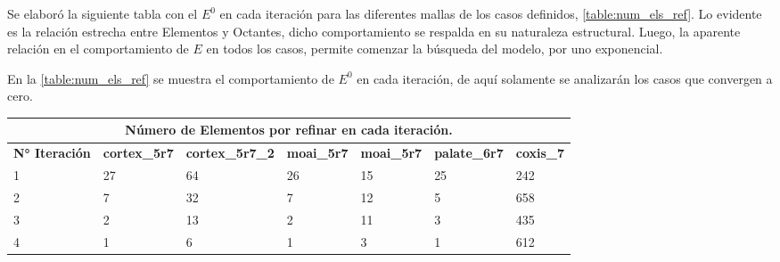Se elaboró la siguiente tabla con el $E^0$ en cada iteración para las diferentes mallas de los casos definidos, \autoref{table:num_els_ref}. Lo evidente es la relación estrecha entre Elementos y Octantes, dicho comportamiento se respalda en su naturaleza estructural. Luego, la aparente relación en el comportamiento de $E$ en todos los casos, permite comenzar la búsqueda del modelo, por uno exponencial.


En la \autoref{table:num_els_ref} se muestra el comportamiento de $E^0$ en cada iteración, de aquí solamente se analizarán los casos que convergen a cero.

\begin{table}[!ht]
\begin{tabular}{|lllllll|}
\hline
\multicolumn{7}{|c|}{Número de Elementos por refinar en cada iteración.}                                                                                                                                                                                                                    \\ \hline
\multicolumn{1}{|l|}{\textbf{N° Iteración}} & \multicolumn{1}{l|}{\textbf{cortex\_5r7}} & \multicolumn{1}{l|}{\textbf{cortex\_5r7\_2}} & \multicolumn{1}{l|}{\textbf{moai\_5r7}} & \multicolumn{1}{l|}{\textbf{moai\_5r7}} & \multicolumn{1}{l|}{\textbf{palate\_6r7}} & \textbf{coxis\_7} \\ \hline
\multicolumn{1}{|l|}{1}                     & \multicolumn{1}{l|}{27}                   & \multicolumn{1}{l|}{64}                      & \multicolumn{1}{l|}{26}                 & \multicolumn{1}{l|}{15}                 & \multicolumn{1}{l|}{25}                   & 242               \\ \hline
\multicolumn{1}{|l|}{2}                     & \multicolumn{1}{l|}{7}                    & \multicolumn{1}{l|}{32}                      & \multicolumn{1}{l|}{7}                  & \multicolumn{1}{l|}{12}                 & \multicolumn{1}{l|}{5}                    & 658               \\ \hline
\multicolumn{1}{|l|}{3}                     & \multicolumn{1}{l|}{2}                    & \multicolumn{1}{l|}{13}                      & \multicolumn{1}{l|}{2}                  & \multicolumn{1}{l|}{11}                 & \multicolumn{1}{l|}{3}                    & 435               \\ \hline
\multicolumn{1}{|l|}{4}                     & \multicolumn{1}{l|}{1}                    & \multicolumn{1}{l|}{6}                       & \multicolumn{1}{l|}{1}                  & \multicolumn{1}{l|}{3}                  & \multicolumn{1}{l|}{1}                    & 612               \\ \hline

\end{tabular}
\end{table}
